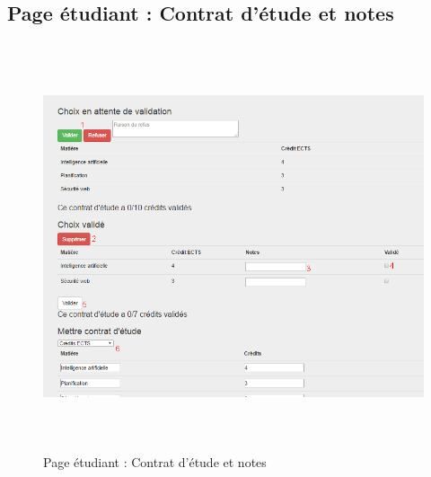      \subsection{Page étudiant : Contrat d'étude et notes}
     \label{en}
     \begin{figure}[H]
     	\centering
     	\includegraphics[width=16cm,height=12cm]{Images/Admin/note_admin.png}
     	\caption{Page étudiant : Contrat d'étude et notes}
     	
     \end{figure}
     
     
